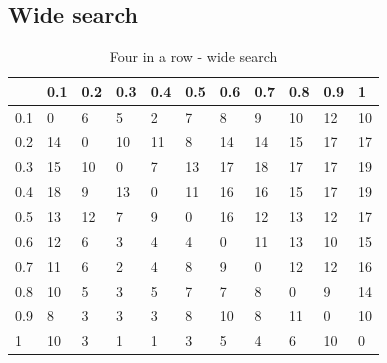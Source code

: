 \documentclass[
11pt, %
english, %
singlespacing, %
headsepline, %
]{MastersDoctoralThesis} %
\begin{document}
\begin{appendices}
\subsection{Wide search}
\begin{table}[H]
	\centering
	\begin{tabular}{|l||l|l|l|l|l|l|l|l|l|l|}
		\hline
		& 0.1 & 0.2 & 0.3 & 0.4 & 0.5 & 0.6 & 0.7 & 0.8 & 0.9 & 1  \\ \hline\hline
		0.1 & 0   & 6   & 5   & 2   & 7   & 8   & 9   & 10  & 12  & 10 \\ \hline
		0.2 & 14  & 0   & 10  & 11  & 8   & 14  & 14  & 15  & 17  & 17 \\ \hline
		0.3 & 15  & 10  & 0   & 7   & 13  & 17  & 18  & 17  & 17  & 19 \\ \hline
		0.4 & 18  & 9   & 13  & 0   & 11  & 16  & 16  & 15  & 17  & 19 \\ \hline
		0.5 & 13  & 12  & 7   & 9   & 0   & 16  & 12  & 13  & 12  & 17 \\ \hline
		0.6 & 12  & 6   & 3   & 4   & 4   & 0   & 11  & 13  & 10  & 15 \\ \hline
		0.7 & 11  & 6   & 2   & 4   & 8   & 9   & 0   & 12  & 12  & 16 \\ \hline
		0.8 & 10  & 5   & 3   & 5   & 7   & 7   & 8   & 0   & 9   & 14 \\ \hline
		0.9 & 8   & 3   & 3   & 3   & 8   & 10  & 8   & 11  & 0   & 10 \\ \hline
		1   & 10  & 3   & 1   & 1   & 3   & 5   & 4   & 6   & 10  & 0  \\ \hline
	\end{tabular}
	\caption{Four in a row - wide search}
	\label{table:fourinarow-wide}
\end{table}



\end{appendices}
\end{document}
